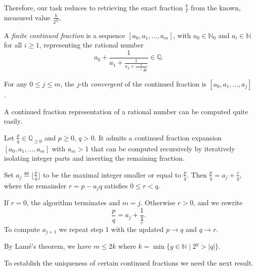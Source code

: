\documentclass[a4paper, oneside, 12pt]{amsart}
\begin{document}
Therefore, our task reduces to retrieving the exact fraction \(\tfrac{k}{r}\) from the known, measured value \(\tfrac{h}{2^Q}\).

\begin{definition}\label{def:continued-fraction}
  A  \emph{finite continued fraction} is a sequence \([a_0, a_1, \dots, a_m]\), with \(a_0 \in \mathbb{N}_0\) and \(a_i \in \mathbb{N}\) for all \(i \geq 1\), representing the rational number
  \begin{equation}
    a_{0} + \frac{1}{a_{1} + \frac{1}{a_{2} + \frac{1}{\dots + \frac{1}{a_{m}}}}} \in \mathbb{Q}.
  \end{equation}

  For any \(0 \leq j \leq m\), the \(j\)-th \emph{convergent} of the continued fraction is \([a_0, a_1, \dots, a_j]\).
\end{definition}

A continued fraction representation of a rational number can be computed quite easily.

\begin{remark}\label{rmk:continued-fraction-algo}
  Let \(\frac{p}{q} \in \mathbb{Q}_{\geq 0}\) and \(p \geq 0\), \(q >0\).
  It admits a continued fraction expansion \([a_0, a_1, \dots, a_m]\) with \(a_m > 1\) that can be computed recursively by iteratively isolating integer parts and inverting the remaining fraction.
  \begin{thmlist}
    \item  Set \(a_j \eqdef \lfloor \frac{p}{q} \rfloor\) to be the maximal integer smaller or equal to \(\frac{p}{q}\).
    Then  \(\frac{p}{q} = a_j + \frac{r}{q}\), where the remainder \(r = p- a_{j}q\) satisfies \(0 \leq r < q\).
    \item If \(r = 0\), the algorithm terminates and \(m = j\).
    Otherwise \(r > 0\), and we rewrite
    \begin{equation*}
      \frac{p}{q} = a_j + \frac{1}{\frac{q}{r}}.
    \end{equation*}
    To compute \(a_{j+1}\) we repeat step 1 with the updated  \(p \rightarrow q\) and \(q \rightarrow r\).
  \end{thmlist}
    By Lamé's theorem, we have \(m\leq 2k\) where \(k = \min\{y \in \mathbb{N} \mid 2^{y}>|q|\}\).
\end{remark}

To establish the uniqueness of certain continued fractions we need the next result.
\end{document}
